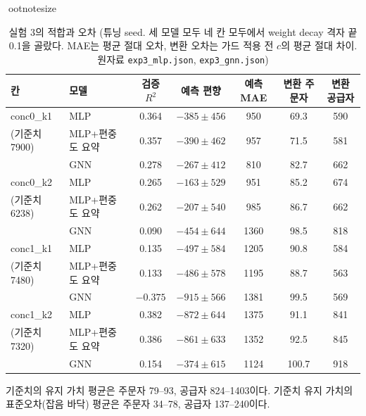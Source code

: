 \documentclass[11pt,a4paper]{article}
\begin{document}
\begin{table}[H]
\centeringootnotesize
\caption{실험 3의 적합과 오차 (튜닝 seed. 세 모델 모두 네 칸 모두에서 weight decay 격자 끝 0.1을 골랐다. MAE는 평균 절대 오차, 변환 오차는 가드 적용 전 $c$의 평균 절대 차이. 원자료 \texttt{exp3\_mlp.json}, \texttt{exp3\_gnn.json})}\label{tab:exp3}
\begin{tabular}{llccccc}
\toprule
칸 & 모델 & 검증 $R^2$ & 예측 편향 & 예측 MAE & 변환 주문자 & 변환 공급자\\
\midrule
conc0\_k1 & MLP & 0.364 & $-385\pm456$ & 950 & 69.3 & 590\\
(기준치 7900) & MLP+편중도 요약 & 0.357 & $-390\pm462$ & 957 & 71.5 & 581\\
 & GNN & 0.278 & $-267\pm412$ & 810 & 82.7 & 662\\
\midrule
conc0\_k2 & MLP & 0.265 & $-163\pm529$ & 951 & 85.2 & 674\\
(기준치 6238) & MLP+편중도 요약 & 0.262 & $-207\pm540$ & 985 & 86.7 & 662\\
 & GNN & 0.090 & $-454\pm644$ & 1360 & 98.5 & 818\\
\midrule
conc1\_k1 & MLP & 0.135 & $-497\pm584$ & 1205 & 90.8 & 584\\
(기준치 7480) & MLP+편중도 요약 & 0.133 & $-486\pm578$ & 1195 & 88.7 & 563\\
 & GNN & $-0.375$ & $-915\pm566$ & 1381 & 99.5 & 569\\
\midrule
conc1\_k2 & MLP & 0.382 & $-872\pm644$ & 1375 & 91.1 & 841\\
(기준치 7320) & MLP+편중도 요약 & 0.386 & $-861\pm633$ & 1352 & 92.5 & 845\\
 & GNN & 0.154 & $-374\pm615$ & 1124 & 100.7 & 918\\
\bottomrule
\end{tabular}
\end{table}

기준치의 유지 가치 평균은 주문자 79--93, 공급자 824--1403이다.
기준치 유지 가치의 표준오차(잡음 바닥) 평균은 주문자 34--78, 공급자 137--240이다.
\end{document}
